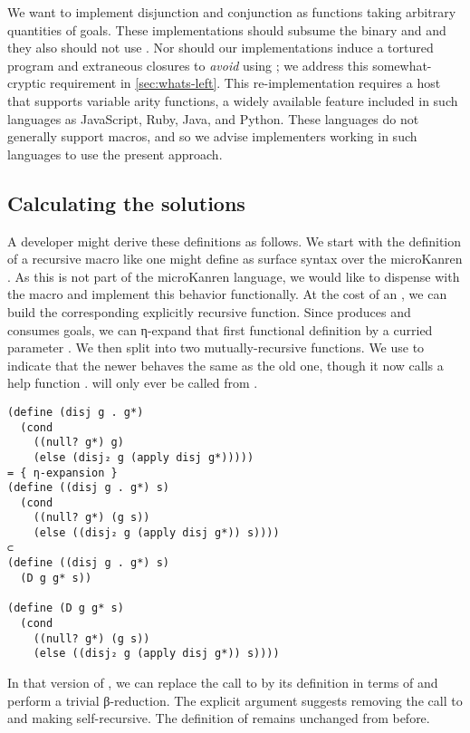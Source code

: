 \documentclass[sigplan,balance=true,pbalance=true,natbib=false]{acmart}
\begin{document}
We want to implement disjunction and conjunction as functions taking
arbitrary quantities of goals. These implementations should subsume
the binary  and  and they also
should not use . Nor should our implementations
induce a tortured program and extraneous closures to \emph{avoid}
using ; we address this somewhat-cryptic requirement
in \cref{sec:whats-left}. This re-implementation requires a host that
supports variable arity functions, a widely available feature included
in such languages as JavaScript, Ruby, Java, and Python. These
languages do not generally support macros, and so we advise
implementers working in such languages to use the present approach.

\subsection{Calculating the solutions}

A developer might derive these definitions as follows. We start with
the definition of a recursive  macro like one might
define as surface syntax over the microKanren . As
this is not part of the microKanren language, we would like to
dispense with the macro and implement this behavior functionally. At
the cost of an , we can build the corresponding
explicitly recursive  function. Since
 produces and consumes goals, we can η-expand that
first functional definition by a curried parameter . We
then split  into two mutually-recursive functions. We
use  to indicate that the newer 
behaves the same as the old one, though it now calls a help function
.\@ {} will only ever be called from
.

\begin{verbatim}
(define (disj g . g*)
  (cond
    ((null? g*) g)
    (else (disj₂ g (apply disj g*)))))
= { η-expansion }
(define ((disj g . g*) s)
  (cond
    ((null? g*) (g s))
    (else ((disj₂ g (apply disj g*)) s))))
⊂
(define ((disj g . g*) s)
  (D g g* s))

(define (D g g* s)
  (cond
    ((null? g*) (g s))
    (else ((disj₂ g (apply disj g*)) s))))
\end{verbatim}

In that version of , we can replace the call to
 by its definition in terms of 
and perform a trivial β-reduction. The explicit 
argument suggests removing the call to  and making
 self-recursive. The definition of 
remains unchanged from before.
\end{document}
